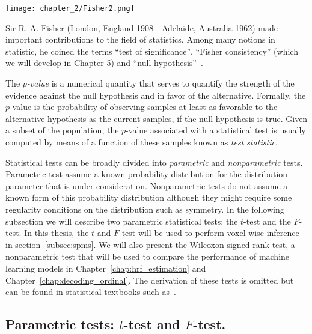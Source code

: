 \begin{marginfigure}
\texttt{[image: chapter\_2/Fisher2.png]}
\hspace{-20pt}\caption{Sir R. A. Fisher (London, England 1908 - Adelaide, Australia 1962) made important contributions to the field of statistics. Among many notions in statistic, he coined the terms ``test of significance'', ``Fisher consistency'' (which we will develop in Chapter 5) and ``null hypothesis''~\citep{fisher1925statistical}.}\label{fig:ronald_fisher}
\end{marginfigure}

The \emph{$p$-value} is a numerical quantity that serves to quantify the strength of the evidence against the null hypothesis and in favor of the alternative. Formally, the $p$-value is the probability of observing samples at least as favorable to the alternative hypothesis as the current samples, if the null hypothesis is true. Given a subset of the population, the $p$-value associated with a statistical test is usually computed by means of a function of these samples known as \emph{test statistic}.


Statistical tests can be broadly divided into \emph{parametric} and \emph{nonparametric} tests. Parametric test assume a known probability distribution for the distribution parameter that is under consideration. Nonparametric tests do not assume a known form of this probability distribution although they might require some regularity conditions on the distribution such as symmetry. In the following subsection we will describe two parametric statistical tests: the $t$-test and the $F$-test. In this thesis, the $t$ and $F$-test will be used to perform voxel-wise inference in section~\ref{subsec:spms}. We will also present the Wilcoxon signed-rank test, a nonparametric test that will be used to compare the performance of machine learning models in Chapter~\ref{chap:hrf_estimation} and Chapter~\ref{chap:decoding_ordinal}. The derivation of these tests is omitted but can be found in statistical textbooks such as~\citep{casella2002statistical, rice2006mathematical}.

\subsection{Parametric tests: $t$-test and $F$-test.}\label{subsec:parametric_tests}


